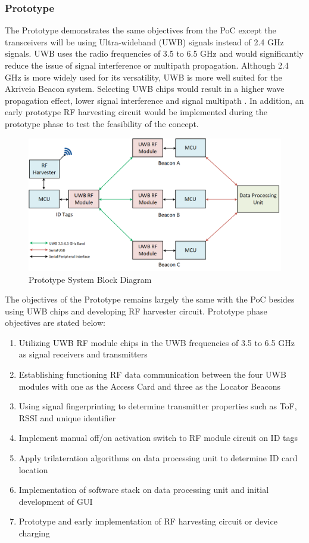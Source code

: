 \break
\subsubsection{Prototype}
The Prototype demonstrates the same objectives from the PoC except the transceivers will be using Ultra-wideband (UWB) signals instead of 2.4 GHz signals. UWB uses the radio frequencies of 3.5 to 6.5 GHz and would significantly reduce the issue of signal interference or multipath propagation. Although 2.4 GHz is more widely used for its versatility, UWB is more well suited for the Akriveia Beacon system. Selecting UWB chips would result in a higher wave propagation effect, lower signal interference and signal multipath \cite{R4}. In addition, an early prototype RF harvesting circuit would be implemented during the prototype phase to test the feasibility of the concept.

\begin{figure}[h!]
    \centering
    \includegraphics[width=\linewidth]{./images/02_sys_Prototype.png}
    \caption{Prototype System Block Diagram}
    \label{fig:prototype_sys_blk}
\end{figure}
\bigskip

The objectives of the Prototype remains largely the same with the PoC besides using UWB
chips and developing RF harvester circuit. Prototype phase objectives are stated below:

\begin{enumerate}
    \item Utilizing UWB RF module chips in the UWB frequencies of 3.5 to 6.5 GHz as signal receivers and transmitters
    \item Establishing functioning RF data communication between the four UWB modules with one as the Access Card and three as the Locator Beacons
    \item Using signal fingerprinting to determine transmitter properties such as ToF, RSSI and unique identifier
    \item Implement manual off/on activation switch to RF module circuit on ID tags
    \item Apply trilateration algorithms on data processing unit to determine ID card location
    \item Implementation of software stack on data processing unit and initial development of GUI
    \item Prototype and early implementation of RF harvesting circuit or device charging
\end{enumerate}

